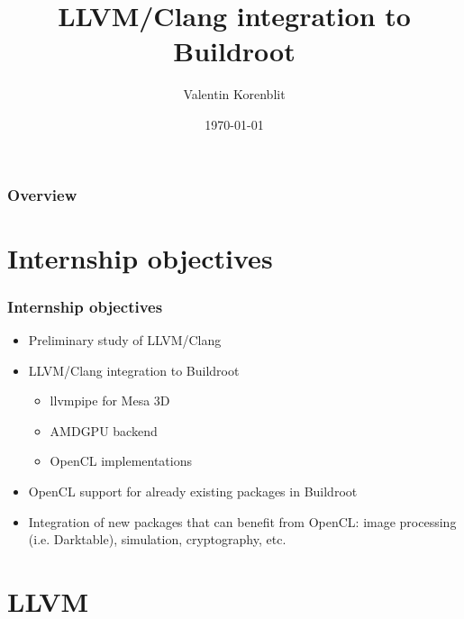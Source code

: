 \documentclass{smilebeamer}
\title[]{LLVM/Clang integration to Buildroot}
\author{Valentin Korenblit}
\institute[Smile]
{
Smile \\~\\
\medskip
\textit{valentin.korenblit@smile.fr}
}
\date{\today}
\begin{document}
\begin{frame}
\titlepage
\end{frame}

\begin{frame}
\frametitle{Overview}
\tableofcontents
\end{frame}

\section{Internship objectives}

\begin{frame}
\frametitle{Internship objectives}
\begin{itemize}
  \item Preliminary study of LLVM/Clang
  \item LLVM/Clang integration to Buildroot
  \begin{itemize}
    \item llvmpipe for Mesa 3D
    \item AMDGPU backend
    \item OpenCL implementations
  \end{itemize}
  \item OpenCL support for already existing packages in Buildroot
  \item Integration of new packages that can benefit from OpenCL:
  image processing (i.e. Darktable), simulation, cryptography, etc.
\end{itemize}
\end{frame}
\section{LLVM}
\end{document}
